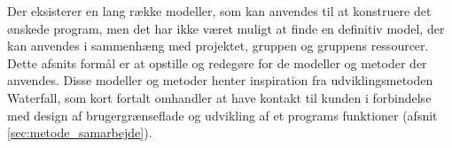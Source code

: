 \label{sec:metode}
Der eksisterer en lang række modeller, som kan anvendes til at konstruere det ønskede program, men det har ikke været muligt at finde en definitiv model, der kan anvendes i sammenhæng med projektet, gruppen og gruppens ressourcer. Dette afsnits formål er at opstille og redegøre for de modeller og metoder der anvendes. Disse modeller og metoder henter inspiration fra udviklingsmetoden Waterfall, som kort fortalt omhandler at have kontakt til kunden i forbindelse med design af brugergrænseflade og udvikling af et programs funktioner (afsnit \ref{sec:metode_samarbejde}).